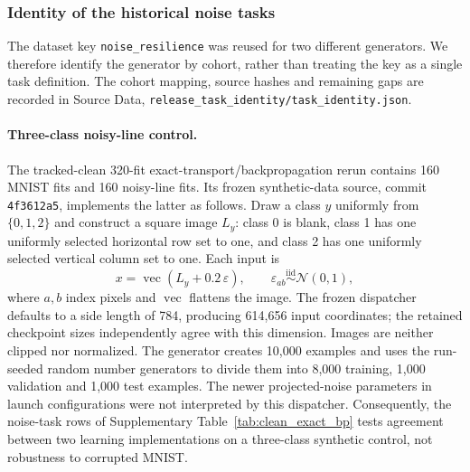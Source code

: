 \subsubsection*{Identity of the historical noise tasks}
The dataset key \texttt{noise\_resilience} was reused for two different generators. We therefore identify the generator by cohort, rather than treating the key as a single task definition. The cohort mapping, source hashes and remaining gaps are recorded in Source Data, \texttt{release\_task\_identity/task\_identity.json}.

\paragraph{Three-class noisy-line control.}
The tracked-clean 320-fit exact-transport/backpropagation rerun contains 160 MNIST fits and 160 noisy-line fits. Its frozen synthetic-data source, commit \texttt{4f3612a5}, implements the latter as follows. Draw a class $y$ uniformly from $\{0,1,2\}$ and construct a square image $L_y$: class 0 is blank, class 1 has one uniformly selected horizontal row set to one, and class 2 has one uniformly selected vertical column set to one. Each input is
\begin{equation}
 x=\operatorname{vec}(L_y+0.2\,\varepsilon),\qquad
 \varepsilon_{ab}\mathrel{\overset{\mathrm{iid}}{\sim}}\mathcal N(0,1),
 \label{eq:legacy_noisy_lines}
\end{equation}
where $a,b$ index pixels and $\operatorname{vec}$ flattens the image. The frozen dispatcher defaults to a side length of 784, producing 614,656 input coordinates; the retained checkpoint sizes independently agree with this dimension. Images are neither clipped nor normalized. The generator creates 10,000 examples and uses the run-seeded random number generators to divide them into 8,000 training, 1,000 validation and 1,000 test examples. The newer projected-noise parameters in launch configurations were not interpreted by this dispatcher. Consequently, the noise-task rows of Supplementary Table~\ref{tab:clean_exact_bp} tests agreement between two learning implementations on a three-class synthetic control, not robustness to corrupted MNIST.


